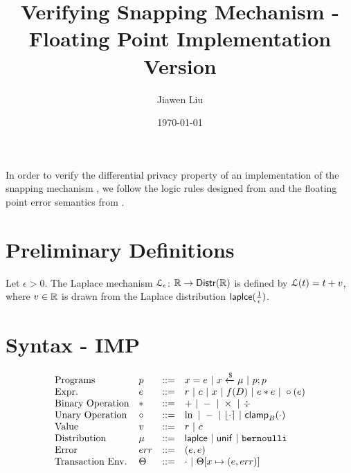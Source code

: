 \documentclass[a4paper,11pt]{article}
\begin{document}
\title{Verifying Snapping Mechanism - Floating Point Implementation Version}
\author{Jiawen Liu}

\date{\today}

\maketitle
In order to verify the differential privacy property of an implementation of the snapping mechanism \cite{mironov2012significance}, we follow the logic rules designed from \cite{barthe2016proving} and the floating point error semantics from \cite{Ramananandro2016unified,Martel2006higher,Becker2018verified,Moscato2017Automatic}.

\section{Preliminary Definitions}
\begin{defn}
Let $\epsilon > 0$. The Laplace mechanism  $\mathcal{L}_{\epsilon}$: $\mathbb{R} \to \mathsf{Distr}(\mathbb{R})$ is defined by $\mathcal{L}(t) = t + v$, where $v \in \mathbb{R}$ is drawn from the Laplace distribution $\mathsf{laplce}(\frac{1}{\epsilon})$.
\end{defn}
%
%
%

\section{Syntax - IMP}
\[\begin{array}{llll}
\mbox{Programs} & \prog & ::= & 
     \varx = \expr ~|~ \varx \samplel \edistr
	~|~ \prog ; \prog \\

\mbox{Expr.} & \expr & ::= & \rval ~|~  \fval
	~|~ \varx ~|~ f(\data) ~|~ \expr \bop \expr
	~|~ \uop (\expr) \\
%
\mbox{Binary Operation} & \bop & ::= & + ~|~ - ~|~ \times ~|~ \div \\
%
\mbox{Unary Operation} & \uop & ::= & \ln ~|~ - ~|~ \round{\cdot} 
	~|~ \clamp_B(\cdot) \\
%
\mbox{Value} & \valv & ::= & \rval ~|~  \fval \\
%
\mbox{Distribution} & \edistr & ::= & \laplace ~|~ \uniform ~|~ \bernoulli \\ 
%
\mbox{Error} & \err & ::= & (\expr, \expr) \\
%
\mbox{Transaction Env.} & \trsenv & ::= & \cdot ~|~ \trsenv[x \mapsto (\expr, \err)] \\
\end{array}
\]
\end{document}
